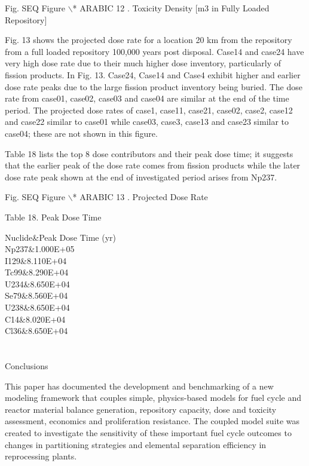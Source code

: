 Fig.   SEQ Figure $\backslash$* ARABIC  12 .  Toxicity Density [m3 in
Fully Loaded Repository]

	Fig. 13 shows the projected dose rate for a location 20 km from the
repository from a full loaded repository 100,000 years post disposal.
Case14 and case24 have very high dose rate due to their much higher dose
inventory, particularly of fission products.  In Fig. 13. Case24, Case14
and Case4 exhibit higher and earlier dose rate peaks due to the large
fission product inventory being buried. The dose rate from case01,
case02, case03 and case04 are similar at the end of the time period. The
projected dose rates of case1, case11, case21, case02, case2, case12 and
case22 similar to case01 while case03, case3, case13 and case23 similar
to case04; these are not shown in this figure.

	Table 18 lists the top 8 dose contributors and their peak dose time; it
suggests that the earlier peak of the dose rate comes from fission
products while the later dose rate peak shown at the end of investigated
period arises from Np237. 

Fig.   SEQ Figure $\backslash$* ARABIC  13 . Projected Dose Rate

Table 18. Peak Dose Time

Nuclide&Peak Dose Time (yr)\\

Np237&1.000E+05\\

I129&8.110E+04\\

Tc99&8.290E+04\\

U234&8.650E+04\\

Se79&8.560E+04\\

U238&8.650E+04\\

C14&8.020E+04\\

Cl36&8.650E+04\\



\section{}
\label{ses_sec:}
Conclusions

	This paper has documented the development and benchmarking of a new
modeling framework that couples simple, physics-based models for fuel
cycle and reactor material balance generation, repository capacity, dose
and toxicity assessment, economics and proliferation resistance.  The
coupled model suite was created to investigate the sensitivity of these
important fuel cycle outcomes to changes in partitioning strategies and
elemental separation efficiency in reprocessing plants.

